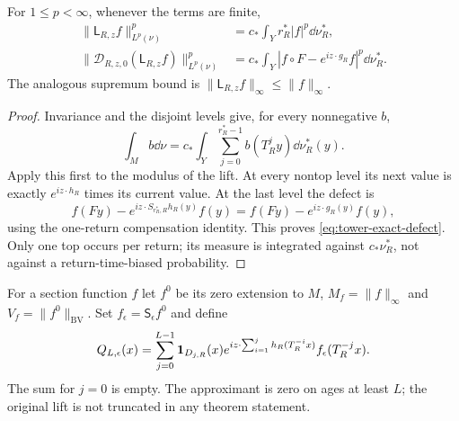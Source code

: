 \begin{lemma}
\label{lem:exact-tower-defect}
For $1\le p<\infty$, whenever the terms are finite,
\begin{align}
 \|\mathsf L_{R,z}f\|_{L^p(\nu)}^p
       &=c_*\int_Y r_R^*|f|^p\dd\nu_R^*,
                      \label{eq:tower-lift-norm}\\
 \|\mathcal D_{R,z,0}(\mathsf L_{R,z}f)\|_{L^p(\nu)}^p
       &=c_*\int_Y|f\circ F-e^{iz\cdot g_R}f|^p\dd\nu_R^*.
                      \label{eq:tower-exact-defect}
\end{align}
The analogous supremum bound is
$\|\mathsf L_{R,z}f\|_\infty\le\|f\|_\infty$.
\end{lemma}
\begin{proof}
Invariance and the disjoint levels give, for every nonnegative $b$,
\[
 \int_M b\dd\nu
   =c_*\int_Y\sum_{j=0}^{r_R^*-1}b(T_R^jy)\dd\nu_R^*(y).
\]
Apply this first to the modulus of the lift. At every nontop level
its next value is exactly $e^{iz\cdot h_R}$ times its current value.
At the last level the defect is
\[
 f(Fy)-e^{iz\cdot S_{r_R^*,R}h_R(y)}f(y)
               =f(Fy)-e^{iz\cdot g_R(y)}f(y),
\]
using the one-return compensation identity. This proves
\eqref{eq:tower-exact-defect}. Only one top occurs per return; its
measure is integrated against $c_*\nu_R^*$, not against a
return-time-biased probability.
\end{proof}

For a section function $f$ let $f^0$ be its zero extension to $M$,
$M_f=\|f\|_\infty$ and $V_f=\|f^0\|_{\mathrm{BV}}$.
Set $f_\epsilon=\mathsf S_\epsilon f^0$ and define
\begin{equation}\label{eq:finite-age-approximation}
 Q_{L,\epsilon}(x)=\sum_{j=0}^{L-1}\one_{D_{j,R}}(x)
 e^{iz\cdot\sum_{i=1}^j h_R(T_R^{-i}x)}
                              f_\epsilon(T_R^{-j}x).
\end{equation}
The sum for $j=0$ is empty. The approximant is zero on ages at least
$L$; the original lift is not truncated in any theorem statement.

